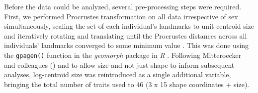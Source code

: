 Before the data could be analyzed, several pre-processing steps were required. First, we performed Procrustes transformation \citep{gowerGeneralizedProcrustesAnalysis1975, drydenStatisticalShapeAnalysis2016} on all data irrespective of sex simultaneously, scaling the set of each individual's landmarks to unit centroid size and iteratively rotating and translating until the Procrustes distances across all individuals' landmarks converged to some minimum value \citep{booksteinLandmarkMethodsForms1997}. This was done using the \texttt{gpagen()} function in the \textit{geomorph} package \citep{adamsGeometricMorphometricAnalyses2019} in \textit{R} \citep{rcoreteamLanguageEnvironmentStatistical2013}. Following Mitteroecker and colleagues (\citeyear{mitteroeckerComparisonCranialOntogenetic2004}) and to allow size and not just shape to inform subsequent analyses, log-centroid size was reintroduced as a single additional variable, bringing the total number of traits used to 46 (3 x 15 shape coordinates + size). 

